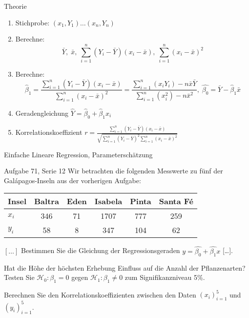 \documentclass[handout]{beamer}
\begin{document}
\begin{frame}{Theorie}
\begin{enumerate}
\item Stichprobe: $(x_1,Y_1)\ldots(x_n, Y_n)$
\item Berechne:
$$
\bar{Y},\; \bar{x},\; \sum_{i=1}^n (Y_i-\bar{Y})(x_i-\bar{x}),\; \sum_{i=1}^n(x_i-\bar{x})^2
$$

\item Berechne:
$$
\hat{\beta}_1 = \frac{\sum_{i=1}^n
(Y_i-\bar{Y})(x_i-\bar{x})}{\sum_{i=1}^n(x_i-\bar{x})^2}=
\frac{\sum_{i=1}^n \left(x_iY_i\right)-n\bar{x}\bar{Y}}{\sum_{i=1}^n \left(x_i^2\right)-n\bar{x}^2},\;
\hat{\beta_0} = \bar{Y}-\hat{\beta}_1\bar{x}
$$

\item Geradengleichung $\hat{Y}=\hat{\beta}_0+\hat{\beta}_1 x_i$

\item Korrelationskoeffizient $r = \frac{\sum_{i=1}^n
    (Y_i-\bar{Y})(x_i-\bar{x})}{\sqrt{\sum_{i=1}^n(Y_i-\bar{Y})^2\sum_{i=1}^n(x_i-\bar{x})^2}}$
\end{enumerate}
\end{frame}

\begin{frame}{Einfache Lineare Regression, Parameterschätzung}
\begin{beamerboxesrounded}[shadow]{Aufgabe 71, Serie 12}
Wir betrachten die folgenden Messwerte zu fünf der Galápagos-Inseln aus der
vorherigen Aufgabe:

\begin{center}{\scriptsize\begin{tabular}{l|ccccc}\toprule
Insel & Baltra & Eden & Isabela & Pinta & Santa Fé\\\midrule
$x_i$&
 346 & 71 & 1707 & 777 & 259\\
$y_i$&
  58 & 8 & 347 & 104 & 62\\
\bottomrule
\end{tabular}}\end{center}

\begin{outline}
\item $[\dots]$ Bestimmen Sie die Gleichung der Regressionsgeraden
$y=\hat{\beta_0}+\hat{\beta_1}x$ [\dots].
\textcolor{black!20}{\item Hat die Höhe der höchsten Erhebung Einfluss auf die Anzahl der Pflanzenarten?
Testen Sie $\mathcal{H}_0: \beta_1 = 0$ gegen $\mathcal{H}_1: \beta_1 \ne 0$
zum Signifikanzniveau 5\%.}

\item Berechnen Sie den Korrelationskoeffizienten zwischen den Daten
$(x_i)_{i=1}^5$ und $(y_i)_{i=1}^5$.
\end{outline}
\end{beamerboxesrounded}
\end{frame}
\end{document}
